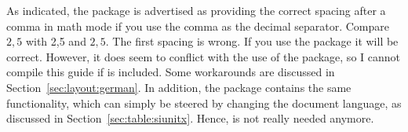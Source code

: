 As indicated, the  package is advertised as providing
the correct spacing after a comma in math mode if you use the comma as
the decimal separator. Compare $2,5$ with 2,5 and $2{,}5$. The first
spacing is wrong. If you use the  package it will be
correct. However, it does seem to conflict with the use of the
 package, so I cannot compile this guide
if  is included. Some  workarounds are discussed in
Section~\ref{sec:layout:german}. In addition, the 
package contains the same functionality, which can simply be steered
by changing the document language, as discussed in
Section~\ref{sec:table:siunitx}. Hence,  is not really
needed anymore.


